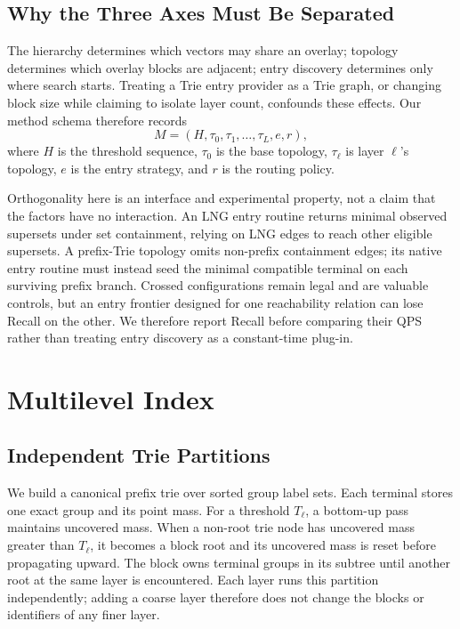 \documentclass[sigconf,review,anonymous]{acmart}
\begin{document}
\subsection{Why the Three Axes Must Be Separated}
The hierarchy determines which vectors may share an overlay; topology
determines which overlay blocks are adjacent; entry discovery determines only
where search starts.  Treating a Trie entry provider as a Trie graph, or
changing block size while claiming to isolate layer count, confounds these
effects.  Our method schema therefore records
\begin{equation}
  M=(H,\tau_0,\tau_1,\ldots,\tau_L,e,r),
\end{equation}
where $H$ is the threshold sequence, $\tau_0$ is the base topology,
$\tau_\ell$ is layer $\ell$'s topology, $e$ is the entry strategy, and $r$ is
the routing policy.

Orthogonality here is an interface and experimental property, not a claim that
the factors have no interaction.  An LNG entry routine returns minimal
observed supersets under set containment, relying on LNG edges to reach other
eligible supersets.  A prefix-Trie topology omits non-prefix containment edges;
its native entry routine must instead seed the minimal compatible terminal on
each surviving prefix branch.  Crossed configurations remain legal and are
valuable controls, but an entry frontier designed for one reachability relation
can lose Recall on the other.  We therefore report Recall before comparing
their QPS rather than treating entry discovery as a constant-time plug-in.

\section{Multilevel Index}
\subsection{Independent Trie Partitions}
We build a canonical prefix trie over sorted group label sets.  Each terminal
stores one exact group and its point mass.  For a threshold $T_\ell$, a
bottom-up pass maintains uncovered mass.  When a non-root trie node has
uncovered mass greater than $T_\ell$, it becomes a block root and its uncovered
mass is reset before propagating upward.  The block owns terminal groups in its
subtree until another root at the same layer is encountered.  Each layer runs
this partition independently; adding a coarse layer therefore does not change
the blocks or identifiers of any finer layer.
\end{document}
